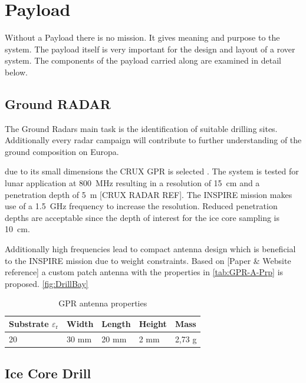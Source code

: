 
\chapter{Payload}
\label{chap:payload}

Without a Payload there is no mission. It gives meaning and purpose to the system. The payload itself is very important for the design and layout of a rover system. The components of the payload carried along are examined in detail below. 

\section{Ground RADAR}
The Ground Radars main task is the identification of suitable drilling sites. Additionally every radar campaign will contribute to further understanding of the ground composition on Europa.

due to its small dimensions the CRUX GPR is selected . The system is tested for lunar application at 800~MHz resulting in a resolution of 15~cm and a penetration depth of 5~m [CRUX RADAR REF]. The INSPIRE mission makes use of a 1.5~GHz frequency to increase the resolution. 
Reduced penetration depths are acceptable since the depth of interest for the ice core sampling is 10~cm.

Additionally high frequencies lead to compact antenna design which is beneficial to the INSPIRE mission due to weight constraints. 
Based on [Paper \& Website reference] a custom patch antenna with the properties in \autoref{tab:GPR-A-Prp} is proposed. \autoref{fig:DrillBay}

\begin{table}[h]
\centering
\begin{tabular}{lllll}
\toprule
Substrate ${\varepsilon}_\text{r}$ & Width & Length & Height & Mass   \\
\midrule
20                         & 30 mm & 20 mm  & 2 mm   & 2,73 g  \\
\bottomrule
\end{tabular}
\caption{GPR antenna properties}
\label{tab:GPR-A-Prp}
\end{table}

\section{Ice Core Drill}

